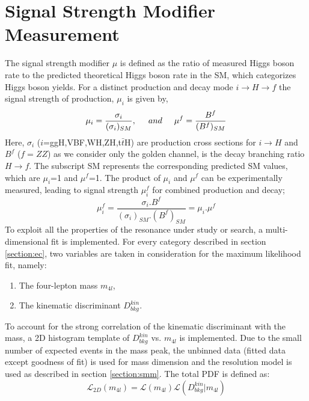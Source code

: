 \section{Signal Strength Modifier Measurement}
The signal strength modifier $\mu$ is defined as the ratio of measured Higgs boson rate to the predicted theoretical Higgs boson rate in the SM, which categorizes Higgs boson yields. For a distinct production and decay mode $i \rightarrow H \rightarrow f$ the signal strength of production, $\mu_i$ is given by,
\begin{equation}
    \mu_i = \frac{\sigma_i}{(\sigma_i)_{SM}}, \hspace{5mm} and  \hspace{5mm}  \mu^f = \frac{B^f}{(B^f)_{SM}}
\end{equation}
Here, $\sigma_i$ ($i$=ggH,VBF,WH,ZH,t$\bar{t}$H) are production cross sections for $i \rightarrow H$ and $B^f$ ($f=ZZ$) as we consider only the golden channel, is the decay branching ratio $H \rightarrow f$. The subscript SM represents the corresponding predicted SM values, which are $\mu_i$=1 and $\mu^f$=1. The product of $\mu_i$ and $\mu^f$ can be experimentally measured, leading to signal strength $\mu^f_i$ for combined production and decay;
\begin{equation}
    \mu^f_i = \frac{\sigma_i . B^f }{(\sigma_i)_{SM} . (B^f)_{SM}} = \mu_i . \mu^f
\end{equation}
To exploit all the properties of the resonance under study or search, a multi-dimensional fit is implemented. For every category described in
section \ref{section:ec}, two variables are taken in consideration for the maximum likelihood fit, namely:
\begin{enumerate}
    \item The four-lepton mass $m_{4l}$,
    \item The kinematic discriminant $D^{kin}_{bkg}$.
\end{enumerate}
To account for the strong correlation of the kinematic discriminant with
the mass, a 2D histogram template of $D^{kin}_{bkg}$ vs. $m_{4l}$ is implemented. Due to the small number of expected events in the mass peak, the unbinned data (fitted data except goodness of fit) is used for mass dimension and the resolution model is used as described in section \ref{section:smm}. The total PDF is defined as:
\begin{equation}
    \mathcal{L}_{2D} (m_{4l}) = \mathcal{L} (m_{4l}) \mathcal{L} (D^{kin}_{bkg} | m_{4l})
    \label{eqn:mdf}
\end{equation}
